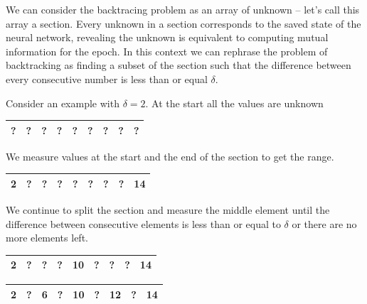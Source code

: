   We can consider the backtracing problem as an array of unknown -- let's call
  this array a section. Every unknown in a section corresponds to the saved
  state of the neural network, revealing the unknown is equivalent to computing
  mutual information for the epoch. In this context we can rephrase the problem
  of backtracking as finding a subset of the section such that the difference
  between every consecutive number is less than or equal $\delta$.

  Consider an example with $\delta = 2$.
  At the start all the values are unknown 

  \begin{table}[H]
    \centering
      \begin{tabular}{|c|c|c|c|c|c|c|c|c|}
      \hline			
        ?&?&?&?&?&?&?&?&? \\
      \hline  
    \end{tabular}
  \end{table}

  We measure values at the start and the end of the section to get the range.

  \begin{table}[H]
    \centering
      \begin{tabular}{|c|c|c|c|c|c|c|c|c|}
      \hline			
        \bf{2}&?&?&?&?&?&?&?&\bf{14}\\
      \hline  
    \end{tabular}
  \end{table}

  We continue to split the section and measure the middle element until the
  difference between consecutive elements is less than or equal to $\delta$ or
  there are no more elements left.


  \begin{table}[H]
    \centering
      \begin{tabular}{|c|c|c|c|c|c|c|c|c|}
      \hline			
        2&?&?&?&\bf{10}&?&?&?&14\\
      \hline  
    \end{tabular}
  \end{table}

  \begin{table}[H]
    \centering
      \begin{tabular}{|c|c|c|c|c|c|c|c|c|}
      \hline			
        2&?&\bf{6}&?&10&?&\bf{12}&?&14\\
      \hline  
    \end{tabular}
  \end{table}

